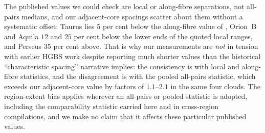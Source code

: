 \documentclass[usenatbib,twoside,twocolumn]{mnras}
\begin{document}
The published values we could check are local or along-fibre separations, not all-pairs medians, and our adjacent-core spacings scatter about them without a systematic offset: Taurus lies $5$ per cent below the along-fibre value of \citet{Hacar2013}, Orion~B and Aquila $12$ and $25$ per cent below the lower ends of the quoted local ranges, and Perseus $35$ per cent above. That is why our measurements are \emph{not} in tension with earlier HGBS work despite reporting much shorter values than the historical ``characteristic spacing'' narrative implies: the consistency is with local and along-fibre statistics, and the disagreement is with the pooled all-pairs statistic, which exceeds our adjacent-core value by factors of $1.1$--$2.1$ in the same four clouds. The region-extent bias applies wherever an all-pairs or pooled statistic is adopted, including the comparability statistic carried here and in cross-region compilations, and we make no claim that it affects these particular published values.






\bsp
\label{lastpage}
\end{document}
